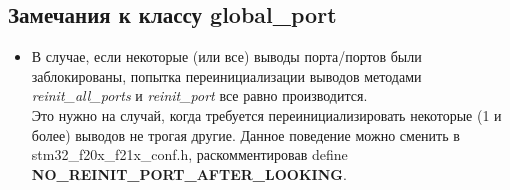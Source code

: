\subsection{Замечания к классу global\_port}
\begin{itemize}
	\item В случае, если некоторые (или все) выводы порта/портов были заблокированы, попытка переинициализации выводов методами \textit{reinit\_all\_ports} и \textit{reinit\_port} все равно производится.\\Это нужно на случай, когда требуется переинициализировать некоторые (1 и более) выводов не трогая другие. Данное поведение можно сменить в stm32\_f20x\_f21x\_conf.h, раскомментировав define  \textbf{NO\_\-REINIT\_\-PORT\_\-AFTER\_\-LOOKING}.
\end{itemize}

